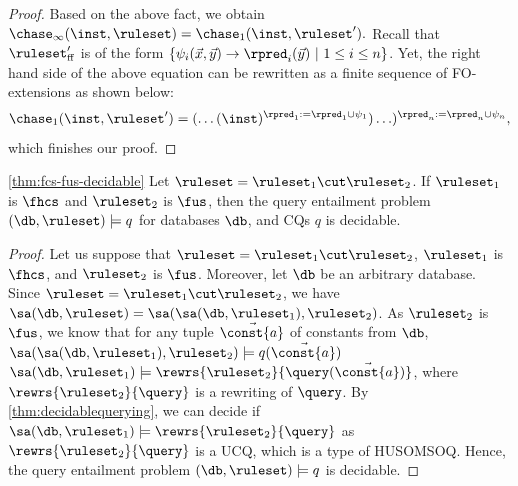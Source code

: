 \begin{proof}
Based on the above fact, we obtain
$
\chase_{\infty}(\inst,\ruleset) = \chase_{1}(\inst,\ruleset').
$
Recall that $\ruleset_{\smash{\mathrm{ff}}}'$ is of the form $\{\psi_{i}(\vec{x}, \vec{y}) \rightarrow \rpred_{i}(\vec{y}) \ | \ 1 \leq i \leq n\}$. Yet, the right hand side of the above equation can be rewritten as a finite sequence of FO-extensions as shown below:
$$
\chase_{1}(\inst, \ruleset') = (\ldots(\inst)^{\rpred_{1}:= \rpred_{1} \cup \psi_{1}})\ldots)^{\rpred_{n}:= \rpred_{n} \cup \psi_{n}},
$$%
which finishes our proof.
\end{proof}

\begin{customthm}{\ref{thm:fcs-fus-decidable}}
	Let $\ruleset = \ruleset_{1} \cut \ruleset_{2}$. If $\ruleset_{1}$ is $\fhcs$ and $\ruleset_{2}$ is $\fus$, then the query entailment problem $(\db,\ruleset) \models q$ for databases $\db$, and CQs $q$ is decidable.
\end{customthm}

\begin{proof} Let us suppose that $\ruleset = \ruleset_{1} \cut \ruleset_{2}$, $\ruleset_{1}$ is $\fhcs$, and $\ruleset_{2}$ is $\fus$. Moreover, let $\db$ be an arbitrary database. Since $\ruleset = \ruleset_{1} \cut \ruleset_{2}$, we have $\sa(\db,\ruleset) = \sa(\sa(\db,\ruleset_{1}),\ruleset_{2})$. As $\ruleset_{2}$ is $\fus$, we know that for any tuple $\vec{\const{a}}$ of constants from $\db$, $\sa(\sa(\db,\ruleset_{1}),\ruleset_{2}) \models q(\vec{\const{a}})$ \iffi $\sa(\db,\ruleset_{1}) \models \rewrs{\ruleset_{2}}{\query(\vec{\const{a}})}$, where $\rewrs{\ruleset_{2}}{\query}$ is a rewriting of $\query$. By \cref{thm:decidablequerying}, we can decide if $\sa(\db,\ruleset_{1}) \models \rewrs{\ruleset_{2}}{\query}$ as $\rewrs{\ruleset_{2}}{\query}$ is a UCQ, which is a type of HUSOMSOQ. Hence, the query entailment problem $(\db,\ruleset) \models q$ is decidable. %
\end{proof}

